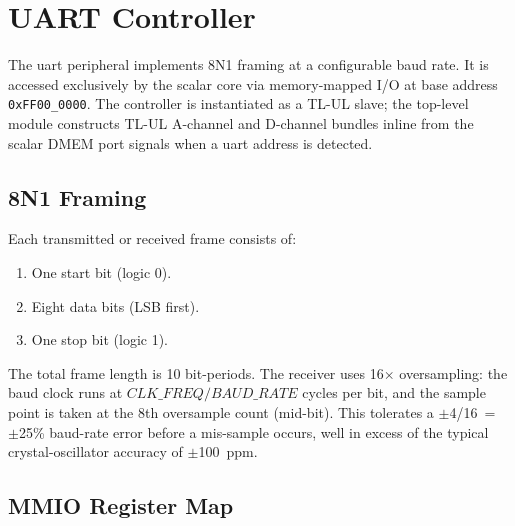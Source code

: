 \section{UART Controller}
\label{sec:uart}

The \gls{uart} peripheral implements 8N1 framing at a configurable baud rate. It is
accessed exclusively by the scalar core via memory-mapped I/O at base address
\texttt{0xFF00\_0000}. The controller is instantiated as a TL-UL slave; the
top-level module constructs TL-UL A-channel and D-channel bundles inline from the
scalar DMEM port signals when a \gls{uart} address is detected.

\subsection{8N1 Framing}

Each transmitted or received frame consists of:
\begin{enumerate}
  \item One start bit (logic 0).
  \item Eight data bits (LSB first).
  \item One stop bit (logic 1).
\end{enumerate}

The total frame length is 10 bit-periods. The receiver uses 16$\times$ oversampling: the
baud clock runs at $\mathit{CLK\_FREQ} / \mathit{BAUD\_RATE}$ cycles per bit, and the
sample point is taken at the 8th oversample count (mid-bit). This tolerates a
$\pm$4/16~=~$\pm$25\% baud-rate error before a mis-sample occurs, well in excess of the
typical crystal-oscillator accuracy of $\pm$100~ppm.

\subsection{MMIO Register Map}

